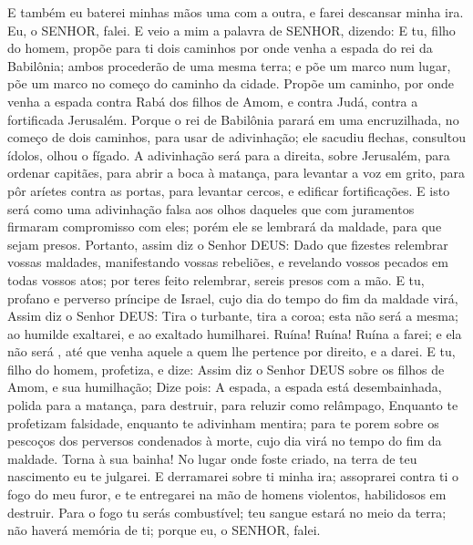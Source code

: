 {E também eu baterei minhas mãos uma com a outra, e farei descansar minha ira. Eu, o SENHOR, falei.
E veio a mim a palavra de SENHOR, dizendo:
E tu, filho do homem, propõe para ti dois caminhos por onde venha a espada do rei da Babilônia; ambos procederão de uma mesma terra; e põe um marco num lugar, põe um marco no começo do caminho da cidade.
Propõe um caminho, por onde venha a espada contra Rabá dos filhos de Amom, e contra Judá, contra a fortificada Jerusalém.
Porque o rei de Babilônia parará em uma encruzilhada, no começo de dois caminhos, para usar de adivinhação; ele sacudiu flechas, consultou ídolos, olhou o fígado.
A adivinhação será para a direita, sobre Jerusalém, para ordenar capitães, para abrir a boca à matança, para levantar a voz em grito, para pôr aríetes contra as portas, para levantar cercos, e edificar fortificações.
E isto será como uma adivinhação falsa aos olhos daqueles que com juramentos firmaram compromisso com eles; porém ele se lembrará da maldade, para que sejam presos.
Portanto, assim diz o Senhor DEUS: Dado que fizestes relembrar vossas maldades, manifestando vossas rebeliões, e revelando vossos pecados em todas vossos atos; por teres feito relembrar, sereis presos com a mão.
E tu, profano e perverso príncipe de Israel, cujo dia do tempo do fim da maldade virá,
Assim diz o Senhor DEUS: Tira o turbante, tira a coroa; esta não será a mesma; ao humilde exaltarei, e ao exaltado humilharei.
Ruína! Ruína! Ruína a farei; e ela não será
{} , até que venha aquele a quem lhe pertence por direito, e
{} a darei.
E tu, filho do homem, profetiza, e dize: Assim diz o Senhor DEUS sobre os filhos de Amom, e sua humilhação; Dize pois: A espada, a espada está desembainhada, polida para a matança, para destruir, para reluzir como relâmpago,
Enquanto te profetizam falsidade, enquanto te adivinham mentira; para te porem sobre os pescoços dos perversos condenados à morte, cujo dia virá no tempo do fim da maldade.
Torna
{} à sua bainha! No lugar onde foste criado, na terra de teu nascimento eu te julgarei.
E derramarei sobre ti minha ira; assoprarei contra ti o fogo do meu furor, e te entregarei na mão de homens violentos,
 habilidosos em destruir.
Para o fogo tu serás combustível; teu sangue estará no meio da terra; não haverá memória de ti; porque eu, o SENHOR, falei.

}
